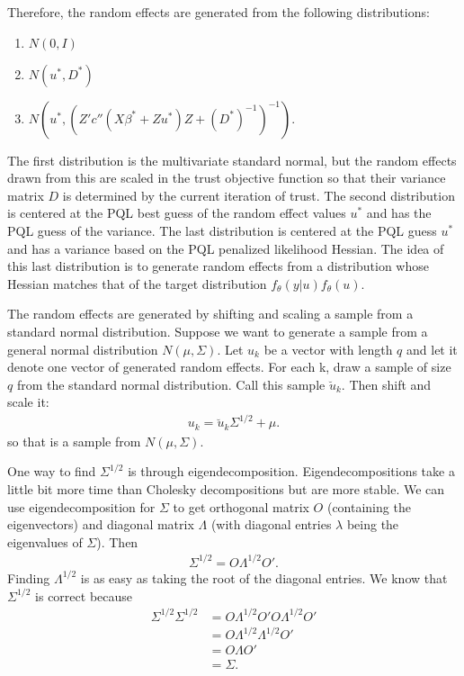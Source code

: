 \documentclass{article}
\begin{document}
Therefore, the random effects are generated from the following distributions:
\begin{enumerate}
\item $N(0,I)$
\item $N(u^*,D^*)$
\item $N(u^*,(Z'  c''(X \beta^*+Zu^*) Z +(D^*)^{-1}   )^{-1})$.
\end{enumerate}

The first distribution is the multivariate standard normal, but the random effects drawn from this are scaled in the trust objective function so that their variance matrix $D$ is determined by the current iteration of trust.   The second distribution is centered at the PQL best guess of the random effect values $u^*$ and  has the PQL guess of the variance. The last distribution is centered at the PQL guess $u^*$ and has a variance based on the PQL penalized likelihood Hessian.  The idea of this last distribution is to generate random effects from a distribution whose Hessian matches that of the target distribution $f_\theta(y|u) f_\theta(u)$.

The random effects are generated by shifting and scaling a sample from a  standard normal distribution.  Suppose we want to generate a sample from a general normal distribution $N(\mu,\Sigma)$.  Let $u_k$ be a vector with length $q$ and let it denote one vector of generated random effects.  For each k, draw a sample of size $q$ from the standard normal distribution. Call this sample $\breve{u}_k$. Then shift and scale it:
\begin{align}
u_k = \breve{u}_k \Sigma^{1/2} + \mu.
\end{align}
so that is a sample from $N(\mu,\Sigma)$.

One way to find $\Sigma^{1/2}$ is through eigendecomposition. Eigendecompositions take a little bit more time than Cholesky decompositions but are more stable. We can use eigendecomposition for $\Sigma$ to get orthogonal matrix $O$ (containing the eigenvectors) and diagonal matrix $\Lambda$ (with diagonal entries $\lambda$ being the eigenvalues of $\Sigma$).  Then
\begin{align}
\Sigma^{1/2}= O \Lambda^{1/2} O'.
\end{align}
Finding $\Lambda^{1/2}$ is as easy as taking the root of the diagonal entries.  We know that $\Sigma^{1/2}$ is correct because
\begin{align}
\Sigma^{1/2} \Sigma^{1/2} &= O \Lambda^{1/2} O'O \Lambda^{1/2} O'\\
&= O \Lambda^{1/2}\Lambda^{1/2} O'\\
&=O \Lambda O' \\
&= \Sigma.
\end{align}
\end{document}
